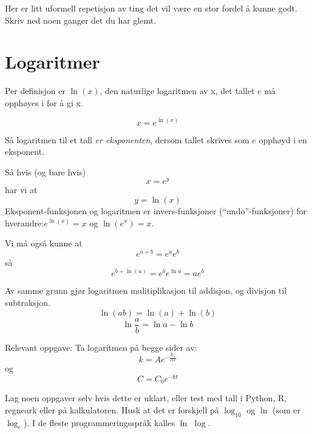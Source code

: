 \documentclass[11pt, A4paper]{article}
\begin{document}
Her er litt uformell repetisjon av ting det vil være en stor fordel å kunne godt. Skriv ned noen ganger det du har glemt.

\section{Logaritmer}

Per definisjon er $\ln(x)$, den naturlige logaritmen av x,  det tallet $e$ må opphøyes i for å gi x.

\begin{equation*}
\label{eq:6}
x = e^{\ln(x)}
\end{equation*}

Så logaritmen til et tall \textit{er eksponenten}, dersom tallet skrives som $e$ opphøyd i en eksponent.

Så hvis (og bare hvis)
\begin{equation*}
\label{eq:8}
x = e^y
\end{equation*}
har vi at
\begin{equation*}
\label{eq:9}
y = \ln(x)
\end{equation*}
Eksponent-funksjonen og logaritmen er invers-funksjoner (``undo''-funksjoner) for hverandre:\newline $e^{\ln(x)}=x$ og $\ln(e^x)=x$. 

Vi må også kunne at
\begin{equation*}
\label{eq:10}
e^{a+b} = e^ae^b
\end{equation*}
så
\begin{equation*}
\label{eq:12}
e^{b+\ln(a)} = e^b e^{\ln{a}} = ae^{b}
\end{equation*}

Av samme grunn gjør logaritmen mulitiplikasjon til addisjon, og divisjon til subtraksjon.
\begin{equation*}
\label{eq:7}
\ln(a b) = \ln(a) + \ln(b)
\end{equation*}
\begin{equation*}
\label{eq:13}
\ln{\frac{a}{b}} = \ln{a}-\ln{b}
\end{equation*}

Relevant oppgave: Ta logaritmen på begge sider av:
\begin{equation*}
\label{eq:14}
k = A e^{-\frac{E_a}{RT}}
\end{equation*}
og
\begin{equation*}
\label{eq:15}
C = C_0 e^{-kt}
\end{equation*}

Lag noen oppgaver selv hvis dette er uklart, eller test med tall i Python, R, regneark
eller på kalkulatoren.  Husk at det er forskjell på $\log_{10}$ og
$\ln$ (som er $\log_e$). I de fleste programmeringsspråk kalles $\ln$ $\log$.
\end{document}
